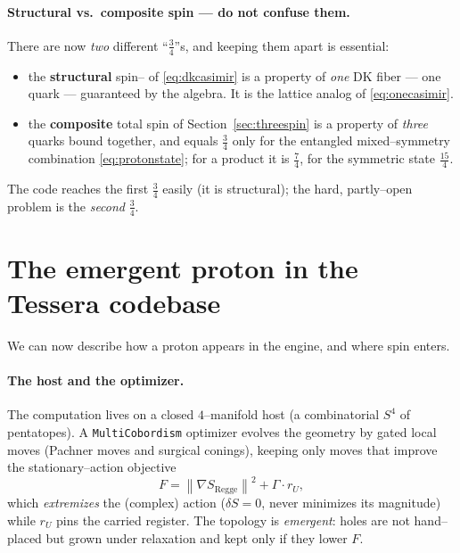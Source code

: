 \documentclass[11pt,oneside]{article}
\newcommand{\norm}[1]{\left\lVert #1 \right\rVert}
\newcommand{\code}[1]{\texttt{#1}}
\begin{document}
\paragraph{Structural vs.\ composite spin --- do not confuse them.}
There are now \emph{two} different ``$\tfrac34$''s, and keeping them apart is
essential:
\begin{itemize}[leftmargin=1.6em]
  \item the \textbf{structural} spin--\textonehalf{} of \eqref{eq:dkcasimir} is a
        property of \emph{one} DK fiber --- one quark --- guaranteed by the
        algebra. It is the lattice analog of \eqref{eq:onecasimir}.
  \item the \textbf{composite} total spin of Section~\ref{sec:threespin} is a
        property of \emph{three} quarks bound together, and equals $\tfrac34$
        only for the entangled mixed--symmetry combination
        \eqref{eq:protonstate}; for a product it is $\tfrac74$, for the symmetric
        state $\tfrac{15}{4}$.
\end{itemize}
The code reaches the first $\tfrac34$ easily (it is structural); the hard,
partly--open problem is the \emph{second} $\tfrac34$.

\section{The emergent proton in the Tessera codebase}
\label{sec:emergent}

We can now describe how a proton appears in the engine, and where spin enters.

\paragraph{The host and the optimizer.}
The computation lives on a closed $4$--manifold host (a combinatorial $S^4$ of
pentatopes). A \code{MultiCobordism} optimizer evolves the geometry by gated
local moves (Pachner moves and surgical conings), keeping only moves that
improve the stationary--action objective
\begin{equation}
  F = \norm{\nabla S_{\text{Regge}}}^2 + \Gamma\cdot r_U ,
\end{equation}
which \emph{extremizes} the (complex) action ($\delta S=0$, never minimizes its
magnitude) while $r_U$ pins the carried register. The topology is
\emph{emergent}: holes are not hand--placed but grown under relaxation and kept
only if they lower $F$.
\end{document}
